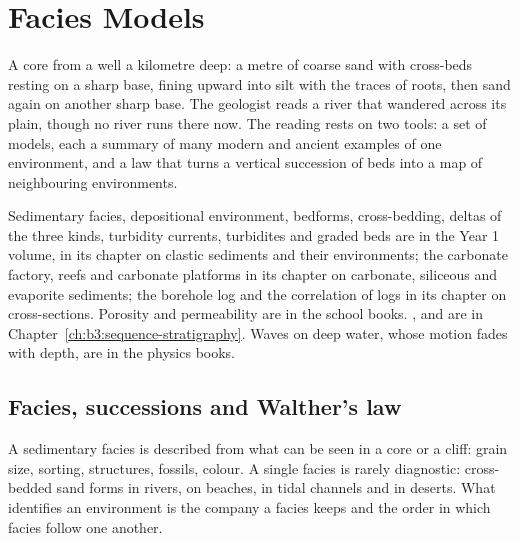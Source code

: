 \chapter{Facies Models}\label{ch:b3:facies-models}

A core from a well a kilometre deep: a metre of coarse sand with
cross-beds resting on a sharp base, fining upward into silt with the traces
of roots, then sand again on another sharp base. The geologist reads a river
that wandered across its plain, though no river runs there now. The reading
rests on two tools: a set of models, each a summary of many modern and
ancient examples of one environment, and a law that turns a vertical
succession of beds into a map of neighbouring environments.

\begin{recall}
Sedimentary facies, depositional environment, bedforms, cross-bedding,
deltas of the three kinds, turbidity currents, turbidites and graded beds are
in the Year 1 volume, in its chapter on clastic sediments and their
environments; the carbonate factory, reefs and carbonate platforms in its
chapter on carbonate, siliceous and evaporite sediments; the borehole log and
the correlation of logs in its chapter on cross-sections. Porosity and
permeability are in the school books. ,  and
 are in Chapter~\ref{ch:b3:sequence-stratigraphy}. Waves on
deep water, whose motion fades with depth, are in the physics books.
\end{recall}

\section{Facies, successions and Walther's law}\label{sec:b3:facies-models:walther}

A sedimentary facies is described from what can be seen in a core or a
cliff: grain size, sorting, structures, fossils, colour. A single facies is
rarely diagnostic: cross-bedded sand forms in rivers, on beaches, in tidal
channels and in deserts. What identifies an environment is the company a
facies keeps and the order in which facies follow one another.

